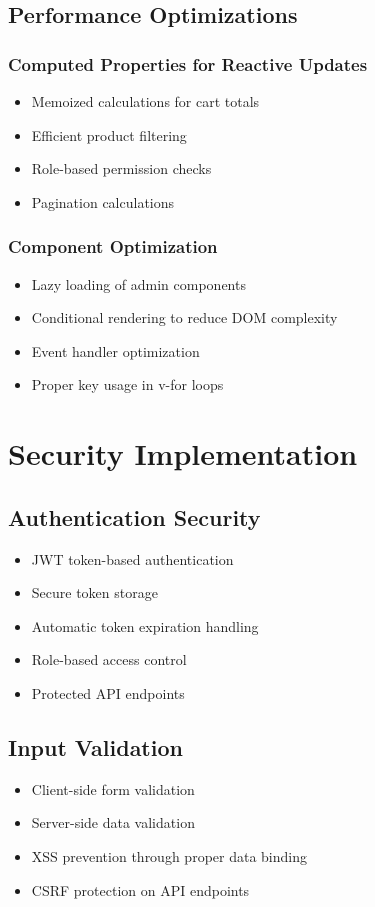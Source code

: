 \documentclass[12pt,a4paper]{article}
\begin{document}
\subsection{Performance Optimizations}

\subsubsection{Computed Properties for Reactive Updates}
\begin{itemize}
    \item Memoized calculations for cart totals
    \item Efficient product filtering
    \item Role-based permission checks
    \item Pagination calculations
\end{itemize}

\subsubsection{Component Optimization}
\begin{itemize}
    \item Lazy loading of admin components
    \item Conditional rendering to reduce DOM complexity
    \item Event handler optimization
    \item Proper key usage in v-for loops
\end{itemize}

\section{Security Implementation}

\subsection{Authentication Security}
\begin{itemize}
    \item JWT token-based authentication
    \item Secure token storage
    \item Automatic token expiration handling
    \item Role-based access control
    \item Protected API endpoints
\end{itemize}

\subsection{Input Validation}
\begin{itemize}
    \item Client-side form validation
    \item Server-side data validation
    \item XSS prevention through proper data binding
    \item CSRF protection on API endpoints
\end{itemize}
\end{document}

